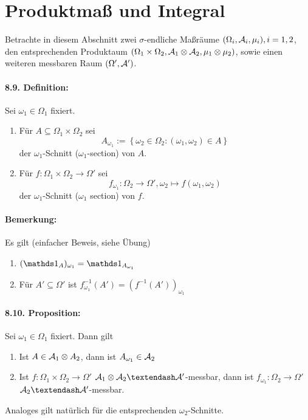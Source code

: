 \section*{Produktma\ss{} und Integral}
Betrachte in diesem Abschnitt zwei $\sigma$-endliche Ma\ss{}r\"aume $(\Omega_i,\mathcal{A}_i,\mu_i),i=1,2$, den entsprechenden Produktaum $(\Omega_1\times\Omega_2,\mathcal{A}_1\otimes\mathcal{A}_2,\mu_1\otimes\mu_2)$, sowie einen weiteren messbaren Raum $(\Omega',\mathcal{A}')$.

\paragraph{8.9. Definition:}Sei $\omega_1\in\Omega_1$ fixiert.
\begin{enumerate}[label=(\roman*)]
    \item F\"ur $A\subseteq\Omega_1\times\Omega_2$ sei
    $$A_{\omega_1}:=\left\{\omega_2\in\Omega_2:(\omega_1,\omega_2)\in A\right\}$$
    der $\omega_1$-Schnitt ($\omega_1$-section) von $A$.
    \item F\"ur $f:\Omega_1\times\Omega_2\to\Omega'$ sei
    $$f_{\omega_1}:\Omega_2\to\Omega',\omega_2\mapsto f(\omega_1,\omega_2)$$
    der $\omega_1$-Schnitt ($\omega_1$ section) von $f$.
\end{enumerate}

\paragraph{Bemerkung:}Es gilt (einfacher Beweis, siehe \"Ubung)
\begin{enumerate}[label=(\roman*)]
    \item $(\ind{A})_{\omega_1}=\ind{A_{\omega_1}}$
    \item F\"ur $A'\subseteq\Omega'$ ist $f^{-1}_{\omega_1}(A')=(f^{-1}(A'))_{\omega_1}$
\end{enumerate}

\paragraph{8.10. Proposition:}Sei $\omega_1\in\Omega_1$ fixiert. Dann gilt
\begin{enumerate}[label=(\roman*)]
    \item Ist $A\in\mathcal{A}_1\otimes A_2$, dann ist $A_{\omega_1}\in\mathcal{A}_2$
    \item Ist $f:\Omega_1\times\Omega_2\to\Omega'$ $\A_1\otimes\A_2\textendash\A'$-messbar, dann ist $f_{\omega_1}:\Omega_2\to\Omega'$ $\A_2\textendash\A'$-messbar.
\end{enumerate}
Analoges gilt nat\"urlich f\"ur die entsprechenden $\omega_2$-Schnitte.

